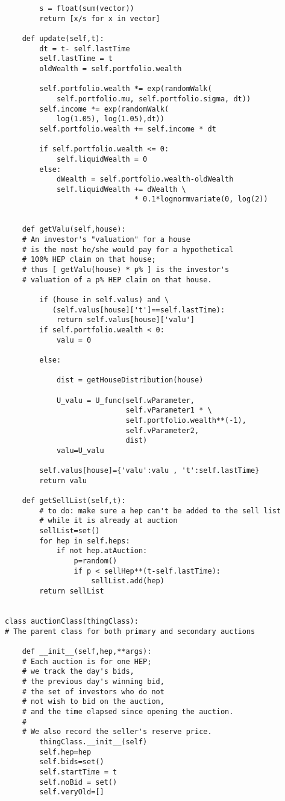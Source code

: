 \begin{lstlisting}
        s = float(sum(vector))
        return [x/s for x in vector]
        
    def update(self,t):
        dt = t- self.lastTime
        self.lastTime = t
        oldWealth = self.portfolio.wealth

        self.portfolio.wealth *= exp(randomWalk(
            self.portfolio.mu, self.portfolio.sigma, dt))
        self.income *= exp(randomWalk(
            log(1.05), log(1.05),dt))
        self.portfolio.wealth += self.income * dt

        if self.portfolio.wealth <= 0:
            self.liquidWealth = 0
        else:
            dWealth = self.portfolio.wealth-oldWealth
            self.liquidWealth += dWealth \
                              * 0.1*lognormvariate(0, log(2))
        

    def getValu(self,house):
    # An investor's "valuation" for a house
    # is the most he/she would pay for a hypothetical
    # 100% HEP claim on that house;
    # thus [ getValu(house) * p% ] is the investor's
    # valuation of a p% HEP claim on that house.

        if (house in self.valus) and \
           (self.valus[house]['t']==self.lastTime):
            return self.valus[house]['valu']
        if self.portfolio.wealth < 0:
            valu = 0

        else:

            dist = getHouseDistribution(house)

            U_valu = U_func(self.wParameter,
                            self.vParameter1 * \
                            self.portfolio.wealth**(-1),
                            self.vParameter2,
                            dist)
            valu=U_valu

        self.valus[house]={'valu':valu , 't':self.lastTime}
        return valu

    def getSellList(self,t):
        # to do: make sure a hep can't be added to the sell list
        # while it is already at auction
        sellList=set()
        for hep in self.heps:
            if not hep.atAuction:
                p=random()
                if p < sellHep**(t-self.lastTime):
                    sellList.add(hep)
        return sellList

    
class auctionClass(thingClass):
# The parent class for both primary and secondary auctions

    def __init__(self,hep,**args):
    # Each auction is for one HEP;
    # we track the day's bids,
    # the previous day's winning bid,
    # the set of investors who do not
    # not wish to bid on the auction,
    # and the time elapsed since opening the auction.
    #
    # We also record the seller's reserve price.
        thingClass.__init__(self)
        self.hep=hep
        self.bids=set()
        self.startTime = t
        self.noBid = set()
        self.veryOld=[]
        

\end{lstlisting}
